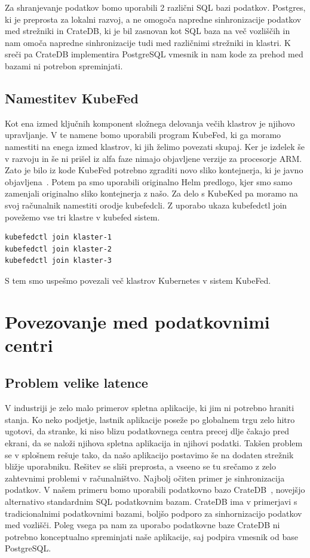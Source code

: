 \documentclass[a4paper, 12pt]{book}
\begin{document}
Za shranjevanje podatkov bomo uporabili 2 različni SQL bazi podatkov.
Postgres, ki je preprosta za lokalni razvoj, a ne omogoča napredne sinhronizacije podatkov med strežniki in CrateDB, ki je bil zasnovan kot SQL baza na več vozliščih in nam omoča napredne sinhronizacije tudi med različnimi strežniki in klastri.
K sreči pa CrateDB implementira PostgreSQL vmesnik in nam kode za prehod med bazami ni potrebon spreminjati.
\section{Namestitev KubeFed}
Kot ena izmed ključnih komponent složnega delovanja večih klastrov je njihovo upravljanje.
V te namene bomo uporabili program KubeFed, ki ga moramo namestiti na enega izmed klastrov, ki jih želimo povezati skupaj.
Ker je izdelek še v razvoju in še ni prišel iz alfa faze nimajo objavljene verzije za procesorje ARM.
Zato je bilo iz kode KubeFed potrebno zgraditi novo sliko kontejnerja, ki je javno objavljena~\cite{https://hub.docker.com/r/hostops/kubefed}.
Potem pa smo uporabili originalno Helm predlogo, kjer smo samo zamenjali originalno sliko kontejnerja z našo.
Za delo s KubeKed pa moramo na svoj računalnik namestiti orodje kubefedcli.
Z uporabo ukaza kubefedctl join povežemo vse tri klastre v kubefed sistem.
\begin{verbatim}
kubefedctl join klaster-1
kubefedctl join klaster-2
kubefedctl join klaster-3
\end{verbatim}
S tem smo uspešmo povezali več klastrov Kubernetes v sistem KubeFed.
\chapter{Povezovanje med podatkovnimi centri}
\section{Problem velike latence}
V industriji je zelo malo primerov spletna aplikacije, ki jim ni potrebno hraniti stanja. 
Ko neko podjetje, lastnik aplikacije poseže po globalnem trgu zelo hitro ugotovi, da stranke, ki niso blizu podatkovnega centra precej dlje čakajo pred ekrani, da se naloži njihova spletna aplikacija in njihovi podatki.
Takšen problem se v splošnem rešuje tako, da našo aplikacijo postavimo še na dodaten strežnik bližje uporabniku. 
Rešitev se sliši preprosta, a vseeno se tu srečamo z zelo zahtevnimi problemi v računalništvo.
Najbolj očiten primer je sinhronizacija podatkov.
V našem primeru bomo uporabili podatkovno bazo CrateDB~\cite{cratedb}, novejšjo alternativo standardnim SQL podatkovnim bazam.
CrateDB ima v primerjavi s tradicionalnimi podatkovnimi bazami, boljšo podporo za sinhornizacijo podatkov med vozlišči.
Poleg vsega pa nam za uporabo podatkovne baze CrateDB ni potrebno konceptualno spreminjati naše aplikacije, saj podpira vmesnik od base PostgreSQL.
\end{document}
